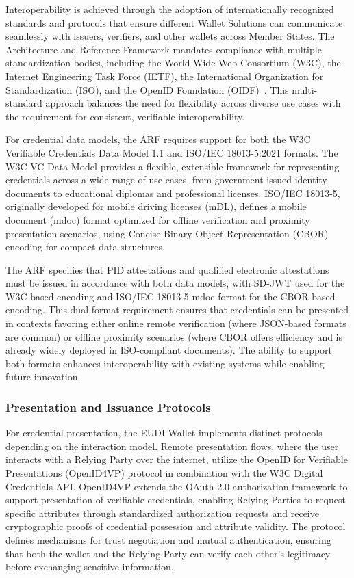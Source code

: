 \documentclass[sigconf,balance,nonacm,authordraft]{acmart}
\begin{document}
Interoperability is achieved through the adoption of internationally recognized standards and protocols that ensure different Wallet Solutions can communicate seamlessly with issuers, verifiers, and other wallets across Member States. The Architecture and Reference Framework mandates compliance with multiple standardization bodies, including the World Wide Web Consortium (W3C), the Internet Engineering Task Force (IETF), the International Organization for Standardization (ISO), and the OpenID Foundation (OIDF)~\cite{EU_ARF2024,Finextra_SSI_Components}. This multi-standard approach balances the need for flexibility across diverse use cases with the requirement for consistent, verifiable interoperability.

For credential data models, the ARF requires support for both the W3C Verifiable Credentials Data Model 1.1 and ISO/IEC 18013-5:2021 formats. The W3C VC Data Model provides a flexible, extensible framework for representing credentials across a wide range of use cases, from government-issued identity documents to educational diplomas and professional licenses. ISO/IEC 18013-5, originally developed for mobile driving licenses (mDL), defines a mobile document (mdoc) format optimized for offline verification and proximity presentation scenarios, using Concise Binary Object Representation (CBOR) encoding for compact data structures.

The ARF specifies that PID attestations and qualified electronic attestations must be issued in accordance with both data models, with SD-JWT used for the W3C-based encoding and ISO/IEC 18013-5 mdoc format for the CBOR-based encoding. This dual-format requirement ensures that credentials can be presented in contexts favoring either online remote verification (where JSON-based formats are common) or offline proximity scenarios (where CBOR offers efficiency and is already widely deployed in ISO-compliant documents). The ability to support both formats enhances interoperability with existing systems while enabling future innovation.

\subsubsection{Presentation and Issuance Protocols}

For credential presentation, the EUDI Wallet implements distinct protocols depending on the interaction model. Remote presentation flows, where the user interacts with a Relying Party over the internet, utilize the OpenID for Verifiable Presentations (OpenID4VP) protocol in combination with the W3C Digital Credentials API. OpenID4VP extends the OAuth 2.0 authorization framework to support presentation of verifiable credentials, enabling Relying Parties to request specific attributes through standardized authorization requests and receive cryptographic proofs of credential possession and attribute validity. The protocol defines mechanisms for trust negotiation and mutual authentication, ensuring that both the wallet and the Relying Party can verify each other's legitimacy before exchanging sensitive information.
\end{document}
